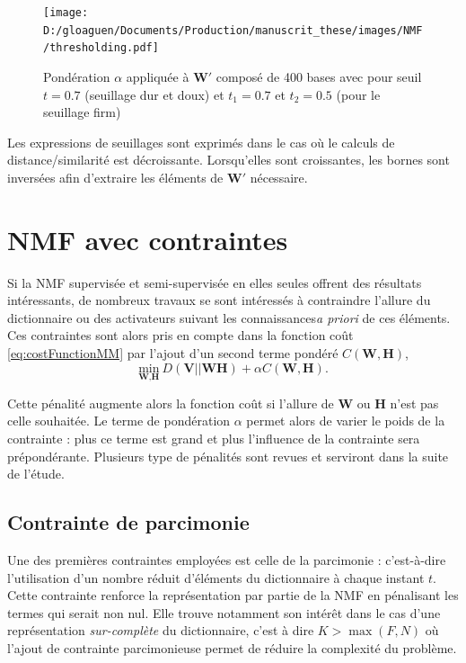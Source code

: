 \begin{figure}
\centering
  \texttt{[image: D:/gloaguen/Documents/Production/manuscrit\_these/images/NMF/thresholding.pdf]}
  \caption{Pondération $\alpha$ appliquée à $\mathbf{W'}$ composé de 400 bases avec pour seuil $t = 0.7$ (seuillage dur et doux) et $t_1 = 0.7$ et $t_2 = 0.5$ (pour le seuillage firm)}
  \label{fig:seuillage}
\end{figure}

Les expressions de seuillages sont exprimés dans le cas où le calculs de distance/similarité est décroissante. Lorsqu'elles sont croissantes, les bornes sont inversées afin d'extraire les éléments de $\mathbf{W'}$ nécessaire.


\section{NMF avec contraintes}\label{part:NMF_contrainte}
Si la NMF supervisée et semi-supervisée en elles seules offrent des résultats intéressants, de nombreux travaux se sont intéressés à contraindre l'allure du dictionnaire ou des activateurs suivant les connaissances\textit{a priori} de ces éléments. Ces contraintes sont alors pris en compte dans la fonction coût \ref{eq:costFunctionMM} par l'ajout d'un second terme pondéré $C(\mathbf{W},\mathbf{H})$, 
\begin{equation}
\underset{\textbf{W},\textbf{H}}{\text{min}}~D\left(\textbf{V} \vert\vert \textbf{WH}\right) + \alpha C(\mathbf{W},\mathbf{H}).
\end{equation}

Cette pénalité augmente alors la fonction coût si l'allure de $\mathbf{W}$ ou $\mathbf{H}$ n'est pas celle souhaitée. Le terme de pondération $\alpha$ permet alors de varier le poids de la contrainte : plus ce terme est grand et plus l'influence de la contrainte sera prépondérante. Plusieurs type de pénalités sont revues et serviront dans la suite de l'étude. 

\subsection{Contrainte de parcimonie}
Une des premières contraintes employées est celle de la parcimonie \cite{hoyer_non-negative_2004} \cite{le2015sparse} : c'est-à-dire l'utilisation d'un nombre réduit d'éléments du dictionnaire à chaque instant $t$. Cette contrainte renforce la représentation par partie de la NMF en pénalisant les termes qui serait non nul. Elle trouve notamment son intérêt dans le cas d'une représentation \textit{sur-complète} du dictionnaire, c'est à dire $K > \max(F,N)$ où l'ajout de contrainte parcimonieuse permet de réduire la complexité du problème. 

